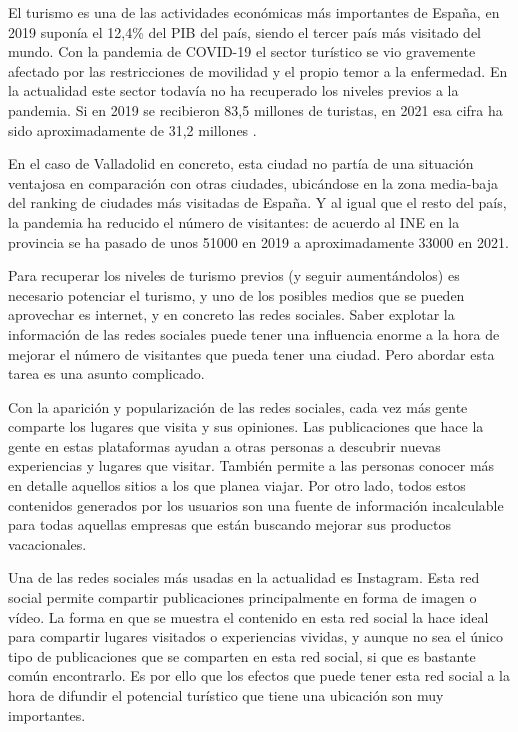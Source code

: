 
El turismo es una de las actividades económicas más importantes de España, en 2019 suponía el 12,4\% del PIB del país, siendo el tercer país más visitado del mundo. Con la pandemia de COVID-19 el sector turístico se vio gravemente afectado por las restricciones de movilidad y el propio temor a la enfermedad. En la actualidad este sector todavía no ha recuperado los niveles previos a la pandemia. Si en 2019 se recibieron 83,5 millones de turistas, en 2021 esa cifra ha sido aproximadamente de 31,2 millones \cite{turismo_espana}.

En el caso de Valladolid en concreto, esta ciudad no partía de una situación ventajosa en comparación con otras ciudades, ubicándose en la zona media-baja del ranking de ciudades más visitadas de España. Y al igual que el resto del país, la pandemia ha reducido el número de visitantes: de acuerdo al INE en la provincia se ha pasado de unos 51000 en 2019 a aproximadamente 33000 en 2021. 

Para recuperar los niveles de turismo previos (y seguir aumentándolos) es necesario potenciar el turismo, y uno de los posibles medios que se pueden aprovechar es internet, y en concreto las redes sociales. Saber explotar la información de las redes sociales puede tener una influencia enorme a la hora de mejorar el número de visitantes que pueda tener una ciudad. Pero abordar esta tarea es una asunto complicado.

Con la aparición y popularización de las redes sociales, cada vez más gente comparte los lugares que visita y sus opiniones. Las publicaciones que hace la gente en estas plataformas ayudan a otras personas a descubrir nuevas experiencias y lugares que visitar. También permite a las personas conocer más en detalle aquellos sitios a los que planea viajar. Por otro lado, todos estos contenidos generados por los usuarios son una fuente de información incalculable para todas aquellas empresas que están buscando mejorar sus productos vacacionales.

Una de las redes sociales más usadas en la actualidad es Instagram. Esta red social permite compartir publicaciones principalmente en forma de imagen o vídeo. La forma en que se muestra el contenido en esta red social la hace ideal para compartir lugares visitados o experiencias vividas, y aunque no sea el único tipo de publicaciones que se comparten en esta red social, si que es bastante común encontrarlo. Es por ello que los efectos que puede tener esta red social a la hora de difundir el potencial turístico que tiene una ubicación son muy importantes.

